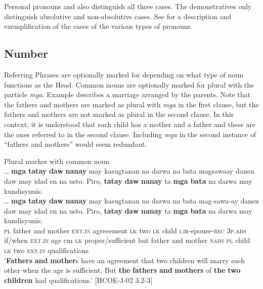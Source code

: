 Personal pronouns and  also distinguish all three cases. The demonstratives only distinguish absolutive and non-absolutive cases. See  for a description and exemplification of the cases of the various types of pronouns.

\subsection{Number}
\label{sec:number}

Referring Phrases are optionally marked for  depending on what type of noun functions as the Head. Common nouns are optionally marked for plural with the particle \textit{mga}. Example  describes a marriage arranged by the parents. Note that the fathers and mothers are marked as plural with \textit{mga} in the first clause, but the fathers and mothers are not marked as plural in the second clause. In this context, it is understood that each child has a mother and a father and these are the ones referred to in the second clause. Including \textit{mga} in the second instance of “fathers and mothers” would seem redundant.

\ea
\label{ex:bata}
Plural marker with common noun \\
… \textbf{mga}  \textbf{tatay}  \textbf{daw}  \textbf{nanay}  may  kasugtanan  na  darwa  na  bata magsawaay  danen  daw  may  idad  en  na  usto. Piro,  \textbf{tatay}  \textbf{daw}  \textbf{nanay}  ta  \textbf{mga}  \textbf{bata}  na  darwa  may  kundisyunis. \\\smallskip
 \gll … \textbf{mga}  \textbf{tatay}  \textbf{daw}  \textbf{nanay}  may  kasugtanan  na  darwa  na  bata mag-sawa-ay  danen  daw  may  idad  en  na  usto. Piro,  \textbf{tatay}  \textbf{daw}  \textbf{nanay}  ta  \textbf{mga}  \textbf{bata}  na  darwa  may  kundisyunis. \\
{} \textsc{pl} father  and  mother  \textsc{ext.in}  agreeement  \textsc{lk} two  \textsc{lk}  child \textsc{i.ir}-spouse-\textsc{rec}  3\textsc{p.abs}  if/when  \textsc{ext.in}  age  cm  \textsc{lk}  proper/sufficient but  father  and  mother  \textsc{nabs}  \textsc{pl}  child  \textsc{lk}  two  \textsc{ext.in}  qualifications \\
\glt `\textbf{Fathers} \textbf{and} \textbf{mother}s have an agreement that two children will marry each other when the age is sufficient. But \textbf{the} \textbf{fathers} \textbf{and} \textbf{mothers} of \textbf{the} \textbf{two} \textbf{children} had qualifications.’ [HCOE-J-02 3.2-3]
\z

